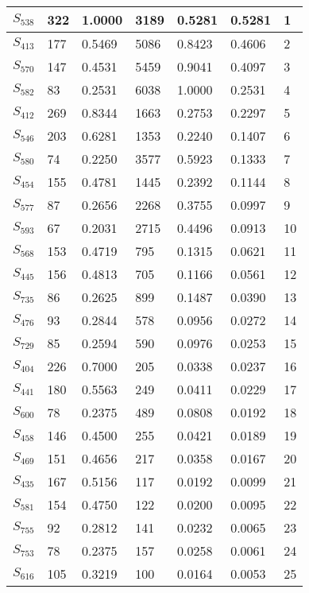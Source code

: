 \begin{xltabular}{\textwidth}{|X|X|X|X|X|X|X|}
        \hline
        \endlastfoot
    $S_{538}$ & 322 & 1.0000 & 3189 & 0.5281 & 0.5281 & 1 \\ \hline
 $S_{413}$ & 177 & 0.5469 & 5086 & 0.8423 & 0.4606 & 2 \\ \hline
 $S_{570}$ & 147 & 0.4531 & 5459 & 0.9041 & 0.4097 & 3 \\ \hline
 $S_{582}$ & 83 & 0.2531 & 6038 & 1.0000 & 0.2531 & 4 \\ \hline
 $S_{412}$ & 269 & 0.8344 & 1663 & 0.2753 & 0.2297 & 5 \\ \hline
 $S_{546}$ & 203 & 0.6281 & 1353 & 0.2240 & 0.1407 & 6 \\ \hline
 $S_{580}$ & 74 & 0.2250 & 3577 & 0.5923 & 0.1333 & 7 \\ \hline
 $S_{454}$ & 155 & 0.4781 & 1445 & 0.2392 & 0.1144 & 8 \\ \hline
 $S_{577}$ & 87 & 0.2656 & 2268 & 0.3755 & 0.0997 & 9 \\ \hline
 $S_{593}$ & 67 & 0.2031 & 2715 & 0.4496 & 0.0913 & 10 \\ \hline
 $S_{568}$ & 153 & 0.4719 & 795 & 0.1315 & 0.0621 & 11 \\ \hline
 $S_{445}$ & 156 & 0.4813 & 705 & 0.1166 & 0.0561 & 12 \\ \hline
 $S_{735}$ & 86 & 0.2625 & 899 & 0.1487 & 0.0390 & 13 \\ \hline
 $S_{476}$ & 93 & 0.2844 & 578 & 0.0956 & 0.0272 & 14 \\ \hline
 $S_{729}$ & 85 & 0.2594 & 590 & 0.0976 & 0.0253 & 15 \\ \hline
 $S_{404}$ & 226 & 0.7000 & 205 & 0.0338 & 0.0237 & 16 \\ \hline
 $S_{441}$ & 180 & 0.5563 & 249 & 0.0411 & 0.0229 & 17 \\ \hline
 $S_{600}$ & 78 & 0.2375 & 489 & 0.0808 & 0.0192 & 18 \\ \hline
 $S_{458}$ & 146 & 0.4500 & 255 & 0.0421 & 0.0189 & 19 \\ \hline
 $S_{469}$ & 151 & 0.4656 & 217 & 0.0358 & 0.0167 & 20 \\ \hline
 $S_{435}$ & 167 & 0.5156 & 117 & 0.0192 & 0.0099 & 21 \\ \hline
 $S_{581}$ & 154 & 0.4750 & 122 & 0.0200 & 0.0095 & 22 \\ \hline
 $S_{755}$ & 92 & 0.2812 & 141 & 0.0232 & 0.0065 & 23 \\ \hline
 $S_{753}$ & 78 & 0.2375 & 157 & 0.0258 & 0.0061 & 24 \\ \hline
 $S_{616}$ & 105 & 0.3219 & 100 & 0.0164 & 0.0053 & 25 \\ \hline

\end{xltabular}

